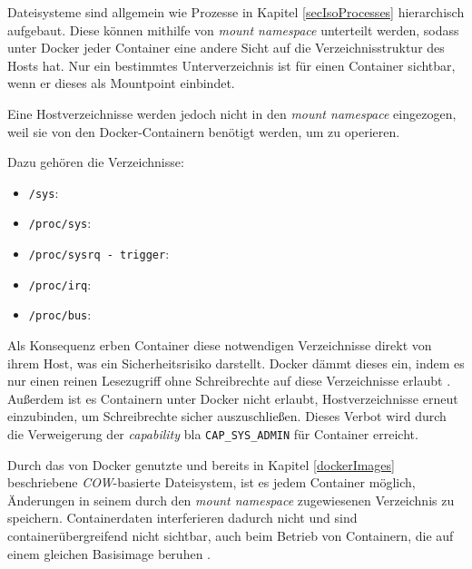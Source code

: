 \documentclass[../main.tex]{subfiles}
\begin{document}
			Dateisysteme sind allgemein wie Prozesse in Kapitel \ref{secIsoProcesses} hierarchisch aufgebaut. Diese können mithilfe von \emph{mount namespace} unterteilt werden, sodass unter Docker jeder Container eine andere Sicht auf die Verzeichnisstruktur des Hosts hat. Nur ein bestimmtes Unterverzeichnis ist für einen Container sichtbar, wenn er dieses als Mountpoint einbindet.

			Eine Hostverzeichnisse werden jedoch nicht in den \emph{mount namespace} eingezogen, weil sie von den Docker-Containern benötigt werden, um zu operieren.

			Dazu gehören die Verzeichnisse:

			\begin{itemize}
				\item \texttt{/sys}:
				\item \texttt{/proc/sys}:
				\item \texttt{/proc/sysrq - trigger}:
				\item \texttt{/proc/irq}:
				\item \texttt{/proc/bus}:
			\end{itemize}

			Als Konsequenz erben Container diese notwendigen Verzeichnisse direkt von ihrem Host, was ein Sicherheitsrisiko darstellt. Docker dämmt dieses ein, indem es nur einen reinen Lesezugriff ohne Schreibrechte auf diese Verzeichnisse erlaubt \cite[S.4]{dockerSecIntro}. Außerdem ist es Containern unter Docker nicht erlaubt, Hostverzeichnisse erneut einzubinden, um Schreibrechte sicher auszuschließen. Dieses Verbot wird durch die Verweigerung der \emph{capability} bla \texttt{CAP\_SYS\_ADMIN} für Container erreicht.

			Durch das von Docker genutzte und bereits in Kapitel \ref{dockerImages} beschriebene \emph{\acrshort{COW}}-basierte Dateisystem, ist es jedem Container möglich, Änderungen in seinem durch den \emph{mount namespace} zugewiesenen Verzeichnis zu speichern. Containerdaten interferieren dadurch nicht und sind containerübergreifend nicht sichtbar, auch beim Betrieb von Containern, die auf einem gleichen Basisimage beruhen \cite[S.4]{dockerSecIntro}.


			\cite[S.4]{dockerSec1}
\end{document}
